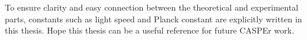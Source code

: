 
To ensure clarity and easy connection between the theoretical and experimental parts, constants such as light speed and Planck constant are explicitly written in this thesis.
Hope this thesis can be a useful reference for future CASPEr work.



